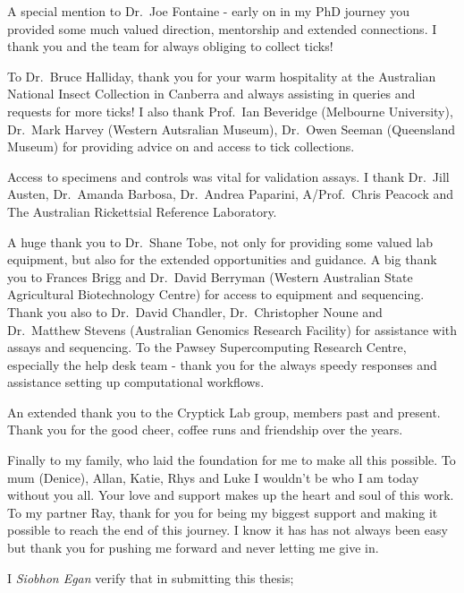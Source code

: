 \documentclass[a4paper, nobind]{templates/ociamthesis}
\begin{document}
\begin{romanpages}
\begin{acknowledgements}
  A special mention to Dr.~Joe Fontaine - early on in my PhD journey you provided some much valued direction, mentorship and extended connections. I thank you and the team for always obliging to collect ticks!

  To Dr.~Bruce Halliday, thank you for your warm hospitality at the Australian National Insect Collection in Canberra and always assisting in queries and requests for more ticks! I also thank Prof.~Ian Beveridge (Melbourne University), Dr.~Mark Harvey (Western Autsralian Museum), Dr.~Owen Seeman (Queensland Museum) for providing advice on and access to tick collections.

  Access to specimens and controls was vital for validation assays. I thank Dr.~Jill Austen, Dr.~Amanda Barbosa, Dr.~Andrea Paparini, A/Prof.~Chris Peacock and The Australian Rickettsial Reference Laboratory.

  A huge thank you to Dr.~Shane Tobe, not only for providing some valued lab equipment, but also for the extended opportunities and guidance. A big thank you to Frances Brigg and Dr.~David Berryman (Western Australian State Agricultural Biotechnology Centre) for access to equipment and sequencing. Thank you also to Dr.~David Chandler, Dr.~Christopher Noune and Dr.~Matthew Stevens (Australian Genomics Research Facility) for assistance with assays and sequencing. To the Pawsey Supercomputing Research Centre, especially the help desk team - thank you for the always speedy responses and assistance setting up computational workflows.

  An extended thank you to the Cryptick Lab group, members past and present. Thank you for the good cheer, coffee runs and friendship over the years.

  Finally to my family, who laid the foundation for me to make all this possible.
  To mum (Denice), Allan, Katie, Rhys and Luke I wouldn't be who I am today without you all. Your love and support makes up the heart and soul of this work.
  To my partner Ray, thank for you for being my biggest support and making it possible to reach the end of this journey.
  I know it has has not always been easy but thank you for pushing me forward and never letting me give in.
\end{acknowledgements}




\begin{declaration}
 	I \emph{Siobhon Egan} verify that in submitting this thesis;


\end{declaration}
\end{romanpages}
\end{document}
